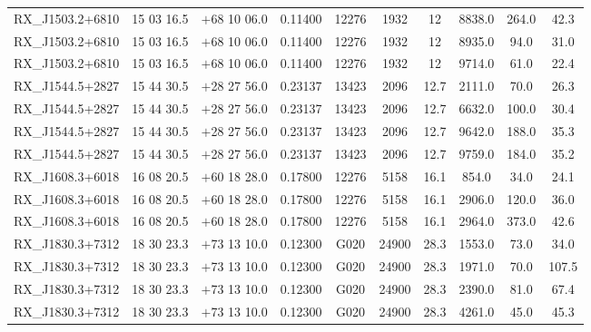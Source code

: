 \begin{landscape}
\begin{center}
\begin{longtable}{l c c c c c c c c c}
RX\_J1503.2+6810  &        15 03 16.5  &         $+$68 10 06.0  &       0.11400  & 12276  &   1932  &       12  &        8838.0  &  264.0  &  42.3  \\
RX\_J1503.2+6810  &        15 03 16.5  &         $+$68 10 06.0  &       0.11400  & 12276  &   1932  &       12  &        8935.0  &  94.0  &   31.0  \\
RX\_J1503.2+6810  &        15 03 16.5  &         $+$68 10 06.0  &       0.11400  & 12276  &   1932  &       12  &        9714.0  &  61.0  &   22.4  \\
RX\_J1544.5+2827  &        15 44 30.5  &         $+$28 27 56.0  &       0.23137  & 13423  &   2096  &       12.7  &      2111.0  &  70.0  &   26.3  \\
RX\_J1544.5+2827  &        15 44 30.5  &         $+$28 27 56.0  &       0.23137  & 13423  &   2096  &       12.7  &      6632.0  &  100.0  &  30.4  \\
RX\_J1544.5+2827  &        15 44 30.5  &         $+$28 27 56.0  &       0.23137  & 13423  &   2096  &       12.7  &      9642.0  &  188.0  &  35.3  \\
RX\_J1544.5+2827  &        15 44 30.5  &         $+$28 27 56.0  &       0.23137  & 13423  &   2096  &       12.7  &      9759.0  &  184.0  &  35.2  \\
RX\_J1608.3+6018  &        16 08 20.5  &         $+$60 18 28.0  &       0.17800  & 12276  &   5158  &       16.1  &      854.0  &   34.0  &   24.1  \\
RX\_J1608.3+6018  &        16 08 20.5  &         $+$60 18 28.0  &       0.17800  & 12276  &   5158  &       16.1  &      2906.0  &  120.0  &  36.0  \\
RX\_J1608.3+6018  &        16 08 20.5  &         $+$60 18 28.0  &       0.17800  & 12276  &   5158  &       16.1  &      2964.0  &  373.0  &  42.6  \\
RX\_J1830.3+7312  &        18 30 23.3  &         $+$73 13 10.0  &       0.12300  & G020  &    24900  &      28.3  &      1553.0  &  73.0  &   34.0  \\
RX\_J1830.3+7312  &        18 30 23.3  &         $+$73 13 10.0  &       0.12300  & G020  &    24900  &      28.3  &      1971.0  &  70.0  &   107.5  \\
RX\_J1830.3+7312  &        18 30 23.3  &         $+$73 13 10.0  &       0.12300  & G020  &    24900  &      28.3  &      2390.0  &  81.0  &   67.4  \\
RX\_J1830.3+7312  &        18 30 23.3  &         $+$73 13 10.0  &       0.12300  & G020  &    24900  &      28.3  &      4261.0  &  45.0  &   45.3  \\

\end{longtable}
\end{center}
\end{landscape}

